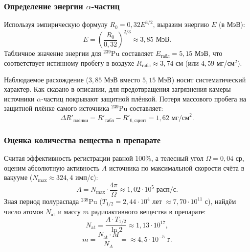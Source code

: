 \documentclass[12pt, a4paper]{article}
\begin{document}
\subsubsection*{Определение энергии $\alpha$-частиц}
Используя эмпирическую формулу $R_0 = 0,32 E^{3/2}$, выразим энергию $E$ (в МэВ):
\begin{equation}
    E = \left( \frac{R_0}{0,32} \right)^{2/3} \approx 3,85 \text{ МэВ}.
\end{equation}
Табличное значение энергии для $^{239}\text{Pu}$ составляет $E_{\text{табл}} = 5,15$ МэВ, что соответствует истинному пробегу в воздухе $R_{\text{табл}} \approx 3,74$ см (или $4,59$ мг/см$^2$). 

Наблюдаемое расхождение ($3,85$ МэВ вместо $5,15$ МэВ) носит систематический характер. Как сказано в описании, для предотвращения загрязнения камеры источники $\alpha$-частиц покрывают защитной плёнкой. Потеря массового пробега на защитной плёнке самого источника $^{239}\text{Pu}$ составляет:
\begin{equation}
    \Delta R'_{\text{плёнки}} = R'_{\text{табл}} - R'_{0, \text{сцинт}} = 1,62 \text{ мг/см}^2.
\end{equation}

\subsubsection*{Оценка количества вещества в препарате}
Считая эффективность регистрации равной 100\%, а телесный угол $\Omega = 0,04$ ср, оценим абсолютную активность $A$ источника по максимальной скорости счёта в вакууме ($N_{\text{max}} \approx 324,4$ имп/с):
\begin{equation}
    A = N_{\text{max}} \cdot \frac{4\pi}{\Omega} \approx 1,02 \cdot 10^5 \text{ расп/с}.
\end{equation}
Зная период полураспада $^{239}\text{Pu}$ ($T_{1/2} = 2,44 \cdot 10^4$ лет $\approx 7,70 \cdot 10^{11}$ с), найдём число атомов $N_{\text{at}}$ и массу $m$ радиоактивного вещества в препарате:
\begin{equation}
    N_{\text{at}} = \frac{A \cdot T_{1/2}}{\ln 2} \approx 1,13 \cdot 10^{17},
\end{equation}
\begin{equation}
    m = \frac{N_{\text{at}} \cdot M}{N_A} = \approx 4,5 \cdot 10^{-5} \text{ г}.
\end{equation}
\end{document}
